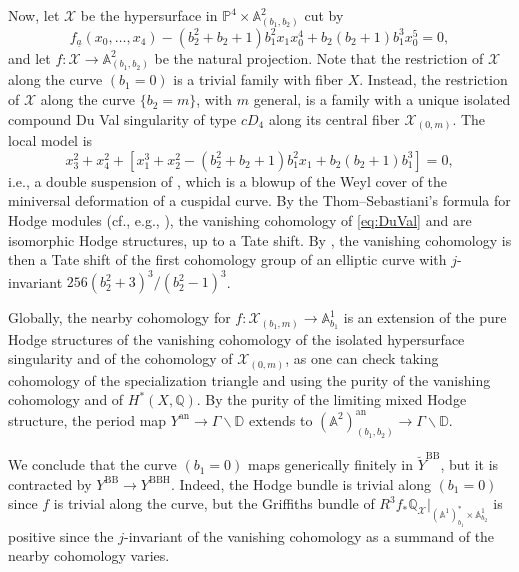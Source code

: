 \documentclass{amsart}
\newcommand{\bs}{\backslash}
\def\bA#1.{\mathbf{A}_{#1}}
\theoremstyle{definition}
\theoremstyle{remark}
\def\bA{\mathbb{A}}
\def\bD{\mathbb{D}}
\def\bQ{\mathbb{Q}}
\def\bP{\mathbb{P}}
\def\cX{\mathcal{X}}
\def\BB{\mathrm{BB}}
\def\BBH{\mathrm{BBH}}
\numberwithin{equation}{section}
\begin{document}
Now, let $\cX$ be the hypersurface in $\bP^4 \times \bA^2_{(b_1, b_2)}$ cut by 
\[
f_{\underline a}(x_0, \ldots, x_4) - (b_2^2+b_2+1)b_1^2 x_1x^4_0 + b_2(b_2+1)b_1^3 x^5_0 = 0,
\]
and let $f \colon \cX \to \bA^2_{(b_1, b_2)}$ be the natural projection. Note that the restriction of $\cX$ along the curve $(b_1=0)$ is a trivial family with fiber $X$. Instead, the restriction of $\cX$ along the curve $\{b_2=m\}$, with $m$ general, is a family with a unique isolated compound Du Val singularity of type $cD_4$ along its central fiber $\cX_{(0,m)}$. The local model is
\begin{equation}\label{eq:DuVal}
x_3^2+x_4^2 + [x^3_1 + x_2^2 - (b_2^2+b_2+1)b_1^2 x_1 + b_2(b_2+1)b_1^3]=0,
\end{equation}
i.e., a double suspension of \cite[Eq.~(7.3)]{CML2013}, which is a blowup of the Weyl cover of the miniversal deformation of a cuspidal curve. By the Thom--Sebastiani's formula for Hodge modules (cf., e.g., \cite[Thm.~1.2]{MSS2020}), the vanishing cohomology of \eqref{eq:DuVal} and \cite[Eq.~(7.3)]{CML2013} are isomorphic Hodge structures, up to a Tate shift. By \cite[\S 7.7]{CML2013}, the vanishing cohomology is then a Tate shift of the first cohomology group of an elliptic curve with $j$-invariant $256(b^2_2+3)^3/(b^2_2-1)^3$. 

Globally, the nearby cohomology for $f \colon \cX_{(b_1, m)} \to \bA^1_{b_1}$
is an extension of the pure Hodge structures of the vanishing cohomology of the isolated hypersurface singularity and of the cohomology of $\cX_{(0,m)}$, as one can check taking cohomology of the specialization triangle \cite[p.276]{peterssteenbrink} and using the purity of the vanishing cohomology and of $H^*(X, \bQ)$. 
By the purity of the limiting mixed Hodge structure, the period map $Y^{\mathrm{an}} \to \Gamma\bs \bD$ extends to $(\bA^2)^{\mathrm{an}}_{(b_1, b_2)} \to \Gamma\bs \bD$. 

We conclude that the curve $(b_1=0)$ maps generically finitely in $\breve Y^\BB$, but it is contracted by $Y^{\BB} \to Y^{\BBH}$. Indeed, the Hodge bundle is trivial along $(b_1=0)$ since $f$ is trivial along the curve, but the Griffiths bundle of $R^3 f_* \bQ_{\cX}|_{(\bA^1)^*_{b_1} \times \bA^1_{b_2}}$ is positive since the $j$-invariant of the vanishing cohomology as a summand of the nearby cohomology varies. 




\end{document}
